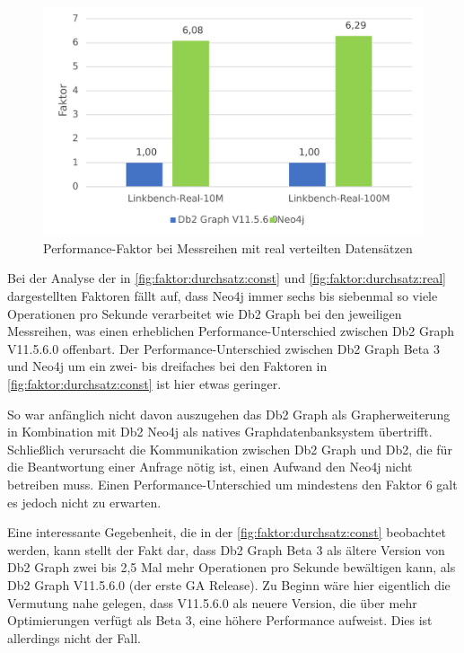 \begin{figure}[!ht]
    \centering
    \includegraphics[width=\textwidth]{images/diagramme/faktor_durchschittlicher_durchsatz_real.pdf}
    \caption{Performance-Faktor bei Messreihen mit real verteilten Datensätzen}
    \label{fig:faktor:durchsatz:real}
\end{figure}

Bei der Analyse der in \autoref{fig:faktor:durchsatz:const} und \autoref{fig:faktor:durchsatz:real} dargestellten Faktoren fällt auf, dass Neo4j immer sechs bis siebenmal so viele Operationen pro Sekunde verarbeitet wie Db2 Graph bei den jeweiligen Messreihen, was einen erheblichen Performance-Unterschied zwischen Db2 Graph V11.5.6.0 offenbart. Der Performance-Unterschied zwischen Db2 Graph Beta 3 und Neo4j um ein zwei- bis dreifaches bei den Faktoren in \autoref{fig:faktor:durchsatz:const} ist hier etwas geringer.

So war anfänglich nicht davon auszugehen das Db2 Graph als Grapherweiterung in Kombination mit Db2 Neo4j als natives Graphdatenbanksystem übertrifft. Schließlich verursacht die Kommunikation zwischen Db2 Graph und Db2, die für die Beantwortung einer Anfrage nötig ist, einen Aufwand den Neo4j nicht betreiben muss. Einen Performance-Unterschied um mindestens den Faktor 6 galt es jedoch nicht zu erwarten. 

Eine interessante Gegebenheit, die in der \autoref{fig:faktor:durchsatz:const} beobachtet werden, kann stellt der Fakt dar, dass Db2 Graph Beta 3 als ältere Version von Db2 Graph zwei bis 2,5 Mal mehr Operationen pro Sekunde bewältigen kann, als Db2 Graph V11.5.6.0 (der erste GA Release). Zu Beginn wäre hier eigentlich die Vermutung nahe gelegen, dass V11.5.6.0 als neuere Version, die über mehr Optimierungen verfügt als Beta 3, eine höhere Performance aufweist. Dies ist allerdings nicht der Fall. 


